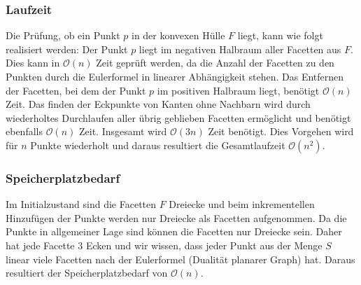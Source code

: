\documentclass[a4paper]{article}
\begin{document}
\subsubsection*{Laufzeit}

Die Prüfung, ob ein Punkt $p$ in der konvexen Hülle $F$ liegt, kann wie folgt realisiert werden: Der Punkt $p$ liegt im negativen Halbraum aller Facetten aus $F$. Dies kann in $\mathcal{O}(n)$ Zeit geprüft werden, da die Anzahl der Facetten zu den Punkten durch die Eulerformel in linearer Abhängigkeit stehen. Das Entfernen der Facetten, bei dem der Punkt $p$ im positiven Halbraum liegt, benötigt $\mathcal{O}(n)$ Zeit. Das finden der Eckpunkte von Kanten ohne Nachbarn wird durch wiederholtes Durchlaufen aller übrig geblieben Facetten ermöglicht und benötigt ebenfalls $\mathcal{O}(n)$ Zeit. Insgesamt wird $\mathcal{O}(3n)$ Zeit benötigt. Dies Vorgehen wird für $n$ Punkte wiederholt und daraus resultiert die Gesamtlaufzeit $\mathcal{O}(n^2)$.

\subsubsection*{Speicherplatzbedarf}

Im Initialzustand sind die Facetten $F$ Dreiecke und beim inkrementellen Hinzufügen der Punkte werden nur Dreiecke als Facetten aufgenommen. Da die Punkte in allgemeiner Lage sind können die Facetten nur Dreiecke sein. Daher hat jede Facette 3 Ecken und wir wissen, dass jeder Punkt aus der Menge $S$ linear viele Facetten nach der Eulerformel (Dualität planarer Graph) hat. Daraus resultiert der Speicherplatzbedarf von $\mathcal{O}(n)$.
\end{document}
